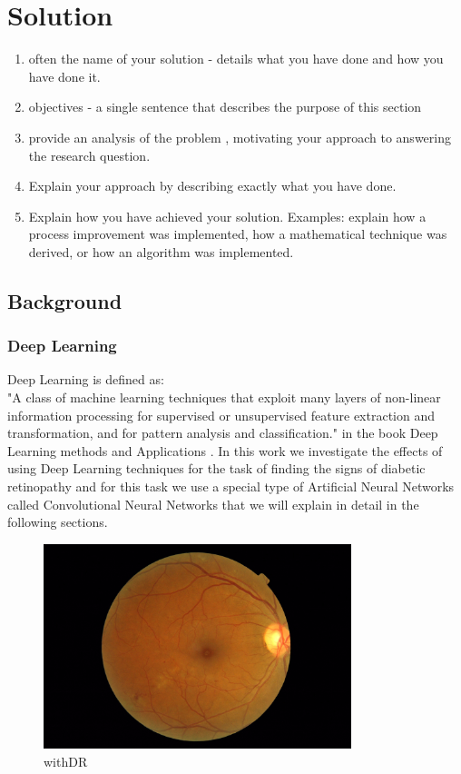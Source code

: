 \chapter{Solution}
\begin{enumerate}
    \item often the name of your solution - details what you have done and how you have done it.
    \item objectives - a single sentence that describes the purpose of this section
    \item provide an analysis of the problem , motivating your approach to answering the research question.
    \item Explain your approach by describing exactly what you have done.
    \item Explain how you have achieved your solution. Examples: explain how a process improvement was implemented, how a mathematical technique was derived, or how an algorithm was implemented.
\end{enumerate}

\section{Background}
\subsection{Deep Learning}
Deep Learning is defined as:\\
"A class of machine learning techniques that exploit many layers of non-linear information processing for supervised or unsupervised feature extraction and transformation, and for pattern analysis and classification." in the book Deep Learning methods and Applications \citep{deng2014deep}. In this work we investigate the effects of using Deep Learning techniques for the task of finding the signs of diabetic retinopathy and for this task we use a special type of Artificial Neural Networks called Convolutional Neural Networks that we will explain in detail in the following sections.   

\begin{figure}[t]
\caption{withDR}
\label{figDR}
\centering
\includegraphics[width=0.8\textwidth]{Figures/DR}
\end{figure}

